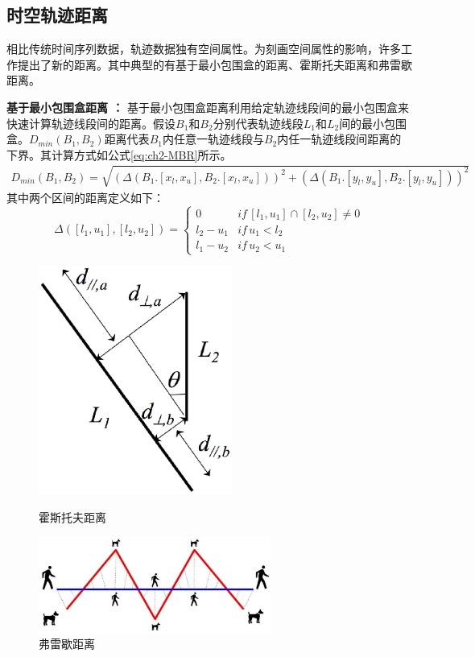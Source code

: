 \subsection{时空轨迹距离}
相比传统时间序列数据，轨迹数据独有空间属性。为刻画空间属性的影响，许多工作提出了新的距离。其中典型的有基于最小包围盒的距离、霍斯托夫距离和弗雷歇距离。

\textbf{基于最小包围盒距离 ：}
基于最小包围盒距离利用给定轨迹线段间的最小包围盒来快速计算轨迹线段间的距离。假设$B_{1}$和$B_{2}$分别代表轨迹线段$L_{1}$和$L_{2}$间的最小包围盒。$D_{min}(B_{1},B_{2})$距离代表$B_{1}$内任意一轨迹线段与$B_{2}$内任一轨迹线段间距离的下界。其计算方式如公式\ref{eq:ch2-MBR}所示。
\begin{eqnarray}\label{eq:ch2-MBR}
D_{min}(B_{1},B_{2})=\sqrt{(\Delta(B_{1}.[x_{l}, x_{u}], B_{2}.[x_{l},x_{u}])  )^2+(\Delta(B_{1}.[y_{l}, y_{u}], B_{2}.[y_{l},y_{u}]) )^2 }
\end{eqnarray}
其中两个区间的距离定义如下：
\begin{equation}\label{eq:ch2-DisInternal}
\Delta([l_{1}, u_{1}], [l_{2},u_{2}]) =\begin{cases}
0 & if \, [l_{1}, u_{1}] \cap [l_{2},u_{2}] \neq 0   \\
l_{2}-u_{1} & if \, u_{1} < l_{2}   \\
l_{1}-u_{2} & if \, u_2 < u_{1}
\end{cases}
\end{equation}


\begin{figure}[t]
	\begin{minipage}[t]{0.5\linewidth}
		\centering
		\includegraphics[width=2.5in]{Fig/chapter2/Hausdorff}
		\caption{霍斯托夫距离}
		\label{fig-chapter2-Hausdorff}
	\end{minipage}%
	\hfill
	\begin{minipage}[t]{0.5\linewidth}
		\centering
		\includegraphics[width=3in]{Fig/chapter2/dogpeople}
		\caption{弗雷歇距离}
		\label{fig-chapter2-Frechet}
	\end{minipage}
\end{figure}

